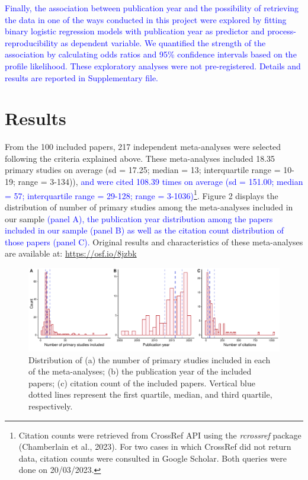 \documentclass[
  ,man,floatsintext]{apa6}
\begin{document}
\textcolor{blue}{Finally, the association between publication year and the possibility of retrieving the data in one of the ways conducted in this project were explored by fitting binary logistic regression models with publication year as predictor and process-reproducibility as dependent variable. We quantified the strength of the association by calculating odds ratios and 95\% confidence intervals based on the profile likelihood. These exploratory analyses were  not pre-registered. Details and results are reported in Supplementary file.}

\hypertarget{results}{%
\section{Results}\label{results}}

From the 100 included papers, 217 independent meta-analyses were selected following the criteria explained above. These meta-analyses included 18.35 primary studies on average (sd = 17.25; median = 13; interquartile range = 10-19; range = 3-134)), \textcolor{blue}{and were cited 108.39 times on average (sd = 151.00; median = 57; interquartile range = 29-128; range = 3-1036)}\footnote{Citation counts were retrieved from CrossRef API using the \emph{rcrossref} package (Chamberlain et al., 2023). For two cases in which CrossRef did not return data, citation counts were consulted in Google Scholar. Both queries were done on 20/03/2023.}.
Figure 2 displays the distribution of number of primary studies among the meta-analyses included in our sample \textcolor{blue}{(panel A), the publication year distribution among the papers included in our sample (panel B) as well as the citation count distribution of those papers (panel C).} Original results and characteristics of these meta-analyses are available at: \url{https://osf.io/8jzbk}

\begin{figure}
\centering
\includegraphics{submission_files/figure-latex/unnamed-chunk-1-1.pdf}
\caption{\label{fig:unnamed-chunk-1}Distribution of (a) the number of primary studies included in each of the meta-analyses; (b) the publication year of the included papers; (c) citation count of the included papers. Vertical blue dotted lines represent the first quartile, median, and third quartile, respectively.}
\end{figure}
\end{document}
